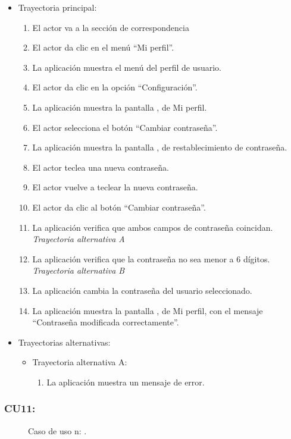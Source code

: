 			\begin{itemize}
				\item Trayectoria principal:
					\begin{enumerate}
						\item El actor va a la sección de correspondencia 
						\item El actor da clic en el menú ``Mi perfil''.
						\item La aplicación muestra el menú del perfil de usuario.
						\item El actor da clic en la opción ``Configuración''.
						\item La aplicación muestra la pantalla , de Mi perfil.
						\item El actor selecciona el botón ``Cambiar contraseña''.
						\item La aplicación muestra la pantalla , de restablecimiento de contraseña.
						\item El actor teclea una nueva contraseña.
						\item El actor vuelve a teclear la nueva contraseña.
						\item El actor da clic al botón ``Cambiar contraseña''.
						\item La aplicación verifica que ambos campos de contraseña coincidan. \textsl{Trayectoria alternativa A}
						\item La aplicación verifica que la contraseña no sea menor a 6 dígitos. \textsl{Trayectoria alternativa B}
						\item La aplicación cambia la contraseña del usuario seleccionado.
						\item La aplicación muestra la pantalla , de Mi perfil, con el mensaje ``Contraseña modificada correctamente''.
					\end{enumerate}
				\item Trayectorias alternativas:
					\begin{itemize}
						\item Trayectoria alternativa A:
							\begin{enumerate}
								\item La aplicación muestra un mensaje de error.
							\end{enumerate}
					\end{itemize}
			\end{itemize}
			
		\subsubsection{CU11: }
			\begin{figure}[htbp!]
				\centering
					\caption{Caso de uso n: .}
				\label{Tabla}
			\end{figure}
			
